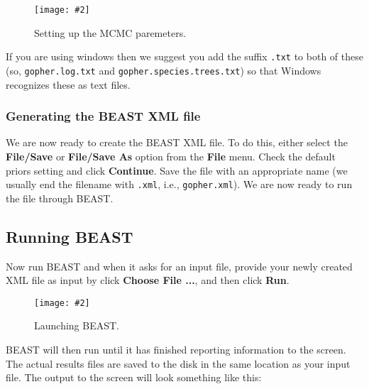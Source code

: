 \documentclass{article}
\newcommand{\includeimage}[2][]{%
\texttt{[image: \#2]}
}
\begin{document}

\begin{figure}
\centering
\includeimage[width=\textwidth]{figures/BEAUti_MCMC}

\caption{\label{fig.MCMC} Setting up the MCMC paremeters.}
\end{figure}


If you are using windows then we suggest you add the suffix \texttt{.txt} to both of these (so,
\texttt{gopher.log.txt} and \texttt{gopher.species.trees.txt}) so that Windows recognizes
these as text files. 

\subsubsection*{Generating the BEAST XML file }

We are now ready to create the BEAST XML file. To do this, either select the {\bf File/Save} or {\bf File/Save As} option from the \textbf{File} menu. Check the default priors setting and click \textbf{Continue}. Save the file with an appropriate name (we usually end the filename with \texttt{.xml}, i.e., \texttt{gopher.xml}). We are now ready to run the file through BEAST. 

\subsection*{Running BEAST }

Now run BEAST and when it asks for an input file, provide your newly
created XML file as input by click \textbf{Choose File ...}, and then click \textbf{Run}. 

\begin{figure}
\centering
\includeimage[width=0.8\textwidth]{figures/BEAST}

\caption{\label{fig.BEAST} Launching BEAST.}
\end{figure}


BEAST will then run until it has finished
reporting information to the screen. The actual results files are
saved to the disk in the same location as your input file. The output to the screen will
look something like this: 
\end{document}
